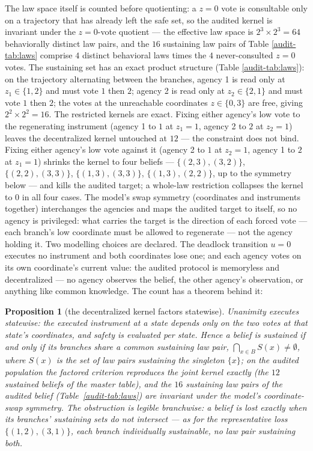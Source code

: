 \documentclass[10pt,twocolumn]{article}
\theoremstyle{plain}
\newtheorem{proposition}[theorem]{Proposition}
\theoremstyle{definition}
\theoremstyle{remark}
\begin{document}
The law space itself is counted before quotienting: a \(z = 0\) vote is
consultable only on a trajectory that has already left the safe set, so
the audited kernel is invariant under the \(z{=}0\)-vote quotient ---
the effective law space is \(2^{3} \times 2^{3} = 64\) behaviorally
distinct law pairs, and the \(16\) sustaining law pairs of Table
\ref{audit-tab:laws} comprise \(4\) distinct behavioral laws times the \(4\)
never-consulted \(z{=}0\) votes. The sustaining set has an
exact product structure (Table
\ref{audit-tab:laws}): on the trajectory alternating between the branches,
agency 1 is read only at \(z_1 \in \{1, 2\}\) and must vote \(1\) then
\(2\); agency 2 is read only at \(z_2 \in \{2, 1\}\) and must vote
\(1\) then \(2\); the votes at the unreachable coordinates
\(z \in \{0, 3\}\) are free, giving \(2^{2} \times 2^{2} = 16\). The
restricted kernels are exact. Fixing either agency's low vote to the
regenerating instrument (agency 1 to \(1\) at \(z_1 = 1\), agency 2 to
\(2\) at \(z_2 = 1\)) leaves the decentralized kernel untouched at
\(12\) --- the constraint does not bind. Fixing either agency's low
vote against it (agency 2 to \(1\) at \(z_2 = 1\), agency 1 to \(2\)
at \(z_1 = 1\)) shrinks the kernel to four beliefs ---
\(\{(2,3),(3,2)\}\), \(\{(2,2),(3,3)\}\), \(\{(1,3),(3,3)\}\),
\(\{(1,3),(2,2)\}\), up to the symmetry below --- and kills the
audited target; a whole-law restriction collapses the kernel to \(0\)
in all four cases. The model's swap symmetry (coordinates and instruments
together) interchanges the agencies and maps the audited target to
itself, so no agency is privileged: what carries the target is the
direction of each forced vote --- each branch's low coordinate must be
allowed to regenerate --- not the agency holding it. Two modelling choices are declared. The deadlock transition
\(u = 0\) executes no instrument and both coordinates lose one; and
each agency votes on its own coordinate's current value: the audited
protocol is memoryless and decentralized --- no agency observes the
belief, the other agency's observation, or anything like common
knowledge. The count has a theorem behind it:

\begin{proposition}[the decentralized kernel factors statewise]
\label{audit-prop:req}
Unanimity executes statewise: the executed instrument at a state depends
only on the two votes at that state's coordinates, and safety is
evaluated per state. Hence a belief is sustained if and only if its
branches share a common sustaining law pair,
\(\bigcap_{x \in B} S(x) \neq \emptyset\), where \(S(x)\) is the set
of law pairs sustaining the singleton \(\{x\}\); on the audited
population the factored criterion reproduces the joint kernel exactly
(the \(12\) sustained beliefs of the master table), and the \(16\)
sustaining law pairs of the audited belief
(Table~\ref{audit-tab:laws}) are invariant under the model's coordinate-swap
symmetry. The obstruction is legible branchwise: a belief is lost
exactly when its branches' sustaining sets do not intersect --- as for
the representative loss \(\{(1,2),(3,1)\}\), each branch individually
sustainable, no law pair sustaining both.
\end{proposition}
\end{document}

